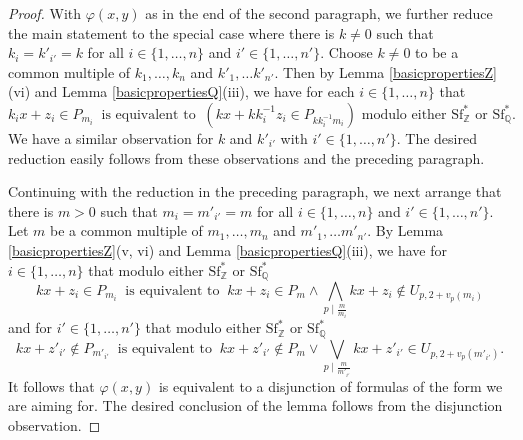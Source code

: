 \documentclass[letterpaper]{amsart}
\newcommand{\qq}{\mathbb{Q}}
\newcommand{\zz}{\mathbb{Z}}
\newcommand{\WSFZ}{\mathrm{Sf}^*_{\zz}}
\newcommand{\WSFQ}{\mathrm{Sf}^*_{\qq}}
\begin{document}
\begin{proof}
With $\varphi(x,y)$ as in the end of the second paragraph, we further reduce the main statement to the special case where there is $k\neq 0$ such that $k_i =  k'_{i'} =k$ for all $i\in \{1, \ldots, n\}$ and $i' \in \{ 1, \ldots, n'\}$. Choose $k\neq 0 $ to be a common multiple of $k_1, \ldots, k_n$ and $k'_1, \ldots k'_{n'}$. Then by Lemma \ref{basicpropertiesZ}(vi) and Lemma \ref{basicpropertiesQ}(iii), we have for each $i \in \{1, \ldots, n\}  $ that
$$ k_ix+z_i \in P_{m_i}\  \text{ is equivalent to }\ (kx+kk^{-1}_iz_i \in P_{kk^{-1}_im_i})   \text{ modulo either } \WSFZ \text{ or }\WSFQ. $$
We have a similar observation for $k$ and $k'_{i'}$ with $i' \in \{1, \ldots, n'\}$. The desired reduction easily follows from these observations and the preceding paragraph. 


Continuing with the reduction in the preceding paragraph, we next arrange that  there is $m > 0$ such that $m_i =  m'_{i'} =m$ for all $i\in \{1, \ldots, n\}$ and $i' \in \{ 1, \ldots, n'\}$.  Let $m$ be a common multiple of $m_1, \ldots, m_n$ and $m'_1, \ldots m'_{n'}$.  By Lemma \ref{basicpropertiesZ}(v, vi) and Lemma \ref{basicpropertiesQ}(iii), we have for $i \in \{ 1, \ldots, n\}$ that modulo either $\WSFZ$  or $\WSFQ$
$$ kx+z_i \in P_{m_i} \  \text{ is equivalent to  }\ kx+z_i \in P_{m} \wedge \bigwedge_{p \mid \frac{m}{m_i}}  kx+z_i \notin U_{p, 2+ v_p(m_i)} $$
and for $i' \in \{ 1, \ldots, n'\}$ that modulo either $\WSFZ$  or $\WSFQ$
$$ kx+z'_{i'} \notin P_{m'_{i'}} \  \text{ is equivalent to }\ kx+z'_{i'} \notin P_{m} \vee \bigvee_{p \mid \frac{m}{m'_{i'}}} kx+z'_{i'} \in U_{p,2+ v_p(m'_{i'})} .  $$
It follows that $\varphi(x, y)$ is equivalent to a disjunction of formulas of the form we are aiming for. The desired conclusion of the lemma follows from the  disjunction observation.
\end{proof}
\end{document}
